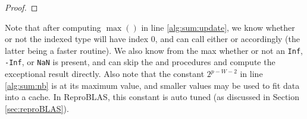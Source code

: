 \begin{proof}
\begin{comment}
      In either case, the ``Require'' clause of Algorithm \ref{alg:update} is satisfied. Therefore, after executing line \ref{alg:sum:update}, the following statements hold:
      \begin{enumerate}
      \item
        The index of $Y$ is $I$ where $I$ is the greatest integer such that $\max(|x_0|, ..., |x_{m - 1}|) < 2^{b_I}$
      \item
        $\mathcal{Y}_k = d(x_0, I + k) + ... + d(x_{j - 1}, I + k)$
      \item
        \Statex ${Y_k}_P \in [1.5  \epsilon^{-1} 2^{a_{I + k}}, 1.75  \epsilon^{-1} 2^{a_{I + k}})$ unless $I + k = 0$, in which case ${Y_0}_P \in (2^{e_{\max}}, 2 \cdot 2^{e_{\max}})$
      \end{enumerate}
      Between lines \ref{alg:sum:innerloop} and \ref{alg:sum:innerloopend}, at most $0.25\epsilon^{-1}2^{-W}$ calls to \ref{alg:sum:deposit} are made, and by Theorem \ref{thm:depositfreq}, and the above initial properties, the requirements of Algorithm \ref{alg:deposit} are met at each call. Therefore, after line \ref{alg:sum:innerloopend}, we have that $\mathcal{Y}_k = d(x_0, I + k) + ... + d(x_{j-1}, I + k)$.

      Again by Theorem \ref{thm:depositfreq}, the requirements of Algorithm \ref{alg:renorm} are met in line \ref{alg:sum:renorm}. Therefore, after execution of line \ref{alg:sum:renorm}, we have that ${Y_k}_P \in [1.5  \epsilon^{-1} 2^{a_{I + k}}, 1.75  \epsilon^{-1} 2^{a_{I + k}})$ unless $I + k = 0$, in which case ${Y_0}_P \in (1.5 \cdot 2^{e_{\max}}, 1.75 \cdot 2^{e_{\max}})$. Therefore, $Y$ is the indexed sum of $x_0, ..., x_{j - 1}$ after line \ref{alg:sum:renorm}, completing the induction.
      \end{comment}
    \end{proof}
    Note that after computing $\max()$ in line \ref{alg:sum:update}, we know whether or not the indexed type will have index 0, and can call either  or  accordingly (the latter being a faster routine). We also know from the max whether or not an \texttt{Inf}, \texttt{-Inf}, or \texttt{NaN} is present, and can skip the  and  procedures and compute the exceptional result directly. Also note that the constant $2^{p - W - 2}$ in line \ref{alg:sum:nb} is at its maximum value, and smaller values may be used to fit data into a cache. In ReproBLAS, this constant is auto tuned (as discussed in Section \ref{sec:reproBLAS}).


